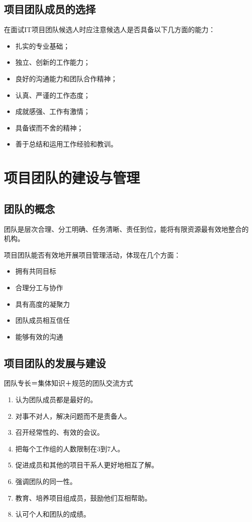 \subsection{项目团队成员的选择}
在面试IT项目团队候选人时应注意候选人是否具备以下几方面的能力：
\begin{itemize}
	\item 扎实的专业基础；
	\item 独立、创新的工作能力；
	\item 良好的沟通能力和团队合作精神；
	\item 认真、严谨的工作态度；
	\item 成就感强、工作有激情；
	\item 具备锲而不舍的精神；
	\item 善于总结和运用工作经验和教训。 
\end{itemize}
\section{项目团队的建设与管理}
\subsection{团队的概念}
团队是层次合理、分工明确、任务清晰、责任到位，能将有限资源最有效地整合的机构。
\par 项目团队能否有效地开展项目管理活动，体现在几个方面：
\begin{itemize}
	\item 拥有共同目标
	\item 合理分工与协作
	\item 具有高度的凝聚力
	\item 团队成员相互信任
	\item 能够有效的沟通
\end{itemize}
\subsection{项目团队的发展与建设}
团队专长＝集体知识＋规范的团队交流方式
\begin{enumerate}
	\item 认为团队成员都是最好的。
	\item 对事不对人，解决问题而不是责备人。
	\item 召开经常性的、有效的会议。
	\item 把每个工作组的人数限制在3到7人。
	\item 促进成员和其他的项目干系人更好地相互了解。
	\item 强调团队的同一性。
	\item 教育、培养项目组成员，鼓励他们互相帮助。
	\item 认可个人和团队的成绩。
\end{enumerate}
